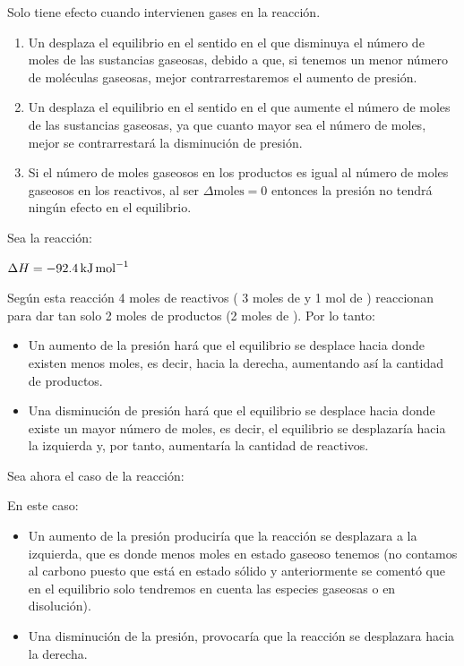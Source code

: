 Solo tiene efecto cuando intervienen gases en la reacción.
\begin{enumerate}[label=\numberballmDarkTeal]
\item Un  desplaza el equilibrio en el sentido en el que disminuya el número de moles de las sustancias gaseosas, debido a que, si tenemos un menor número de moléculas gaseosas, mejor contrarrestaremos el aumento de presión.
\item Un  desplaza el equilibrio en el sentido en el que aumente el número de moles de las sustancias gaseosas, ya que cuanto mayor sea el número de moles, mejor se contrarrestará la disminución de presión.
\item Si el número de moles gaseosos en los productos es igual al número de moles gaseosos en los reactivos, al ser \(\Delta \text{moles} = 0\) entonces la presión no tendrá ningún efecto en el equilibrio.
\end{enumerate}
\begin{example}
    Sea la reacción:
    \begin{center}
        \hspace{12pt} $\Delta H = \energia[kjmol]{-92.4}$
    \end{center}
    Según esta reacción 4 moles de reactivos ( 3 moles de  y 1 mol de ) reaccionan para dar tan solo 2 moles de productos (2 moles de ). Por lo tanto:
    \begin{itemize}
        \item Un aumento de la presión hará que el equilibrio se desplace hacia donde existen menos moles, es decir, hacia la derecha, aumentando así la cantidad de productos.
        \item Una disminución de presión hará que el equilibrio se desplace hacia donde existe un mayor número de moles, es decir, el equilibrio se desplazaría hacia la izquierda y, por tanto, aumentaría la cantidad de reactivos.
    \end{itemize}
\end{example}

\begin{example}
    Sea ahora el caso de la reacción:
    \begin{centeredequation}
    \end{centeredequation}
    En este caso:
    \begin{itemize}
        \item Un aumento de la presión produciría que la reacción se desplazara a la izquierda, que es donde menos moles en estado gaseoso tenemos (no contamos al carbono puesto que está en estado sólido y anteriormente se comentó que en el equilibrio solo tendremos en cuenta las especies gaseosas o en disolución).
        \item Una disminución de la presión, provocaría que la reacción se desplazara hacia la derecha.
    \end{itemize}
\end{example}

